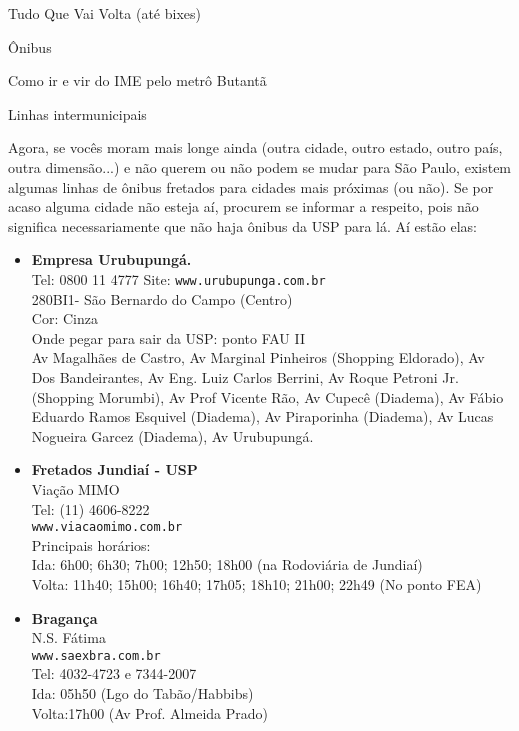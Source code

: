 \begin{secao}{Tudo Que Vai Volta (até bixes)}
\begin{subsecao}{Ônibus}
\begin{subsubsecao}{Como ir e vir do IME pelo metrô Butantã}
\end{subsubsecao}

\begin{subsubsecao}{Linhas intermunicipais}

Agora, se vocês moram mais longe ainda (outra cidade, outro estado, outro país,
outra dimensão...) e não querem ou não podem se mudar para São Paulo, existem
algumas linhas de ônibus fretados para cidades mais próximas (ou não). Se por
acaso alguma cidade não esteja aí, procurem se informar a respeito, pois não significa
necessariamente que não haja ônibus da USP para lá. Aí estão elas:

\begin{itemize}
  \item {\bf Empresa Urubupungá.}\\
    Tel: 0800 11 4777
    Site: {\tt www.urubupunga.com.br}\\
    280BI1- São Bernardo do Campo (Centro)\\
    Cor: Cinza\\
    Onde pegar para sair da USP: ponto FAU II\\
    Av Magalhães de Castro, Av Marginal Pinheiros (Shopping Eldorado), Av Dos
    Bandeirantes, Av Eng. Luiz Carlos Berrini, Av Roque Petroni Jr. (Shopping
    Morumbi), Av Prof Vicente Rão, Av Cupecê (Diadema), Av Fábio Eduardo Ramos
    Esquivel (Diadema), Av Piraporinha (Diadema), Av Lucas Nogueira Garcez
    (Diadema), Av Urubupungá.

  \item {\bf Fretados Jundiaí - USP}\\
    Viação MIMO\\
    Tel: (11) 4606-8222\\
    {\tt www.viacaomimo.com.br}\\
    Principais horários:\\
    Ida: 6h00; 6h30; 7h00; 12h50; 18h00 (na Rodoviária de Jundiaí)\\
    Volta: 11h40; 15h00; 16h40; 17h05; 18h10; 21h00; 22h49 (No ponto FEA)

  \item {\bf Bragança}\\
    N.S. Fátima\\
    {\tt www.saexbra.com.br}\\
    Tel: 4032-4723 e 7344-2007\\
    Ida: 05h50 (Lgo do Tabão/Habbibs)\\
    Volta:17h00 (Av Prof. Almeida Prado)


\end{itemize}
\end{subsubsecao}
\end{subsecao}
\end{secao}
